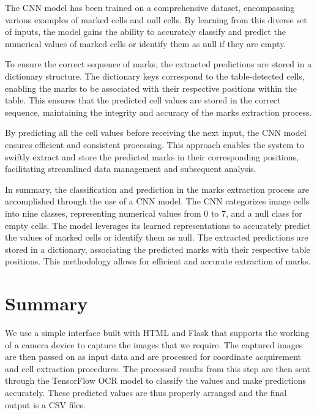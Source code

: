 \noindent The CNN model has been trained on a comprehensive dataset, encompassing various examples of marked cells and null cells. By learning from this diverse set of inputs, the model gains the ability to accurately classify and predict the numerical values of marked cells or identify them as null if they are empty.

\noindent To ensure the correct sequence of marks, the extracted predictions are stored in a dictionary structure. The dictionary keys correspond to the table-detected cells, enabling the marks to be associated with their respective positions within the table. This ensures that the predicted cell values are stored in the correct sequence, maintaining the integrity and accuracy of the marks extraction process.

\noindent By predicting all the cell values before receiving the next input, the CNN model ensures efficient and consistent processing. This approach enables the system to swiftly extract and store the predicted marks in their corresponding positions, facilitating streamlined data management and subsequent analysis.

\noindent In summary, the classification and prediction in the marks extraction process are accomplished through the use of a CNN model. The CNN categorizes image cells into nine classes, representing numerical values from 0 to 7, and a null class for empty cells. The model leverages its learned representations to accurately predict the values of marked cells or identify them as null. The extracted predictions are stored in a dictionary, associating the predicted marks with their respective table positions. This methodology allows for efficient and accurate extraction of marks.
 

\section{Summary}

We use a simple interface built with HTML and Flask that supports the working of a camera device to capture the images that we require. The captured images are then passed on as input data and are processed for coordinate acquirement and cell extraction procedures. The processed results from this step are then sent through the TensorFlow OCR model to classify the values and make predictions accurately. These predicted values are thus properly arranged and the final output is a CSV files.